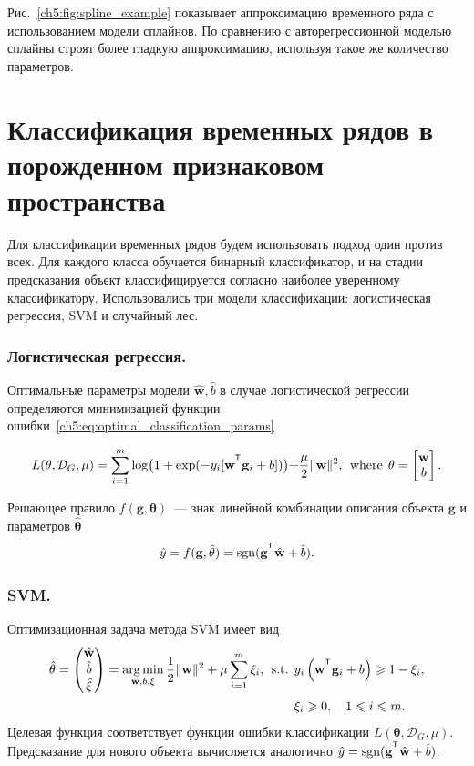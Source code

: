 Рис.~\ref{ch5:fig:spline_example} показывает аппроксимацию временного ряда с использованием модели сплайнов.
По сравнению с авторегрессионной моделью сплайны строят более гладкую аппроксимацию, используя такое же количество параметров.

\section{Классификация временных рядов в порожденном признаковом пространства}
Для классификации временных рядов будем использовать подход один против всех. 
Для каждого класса обучается бинарный классификатор, и на стадии предсказания объект классифицируется согласно наиболее уверенному классификатору.
Использовались три модели классификации: логистическая регрессия, SVM и случайный лес.

\subsubsection{Логистическая регрессия.}
Оптимальные параметры модели $\hat{\mathbf{w}}, \hat{b}$  в случае логистической регрессии определяются минимизацией функции ошибки~\eqref{ch5:eq:optimal_classification_params}

\begin{equation*}
L(\mathbf{\theta}, \mathcal{D}_G, \mu) = \sum_{i=1}^{m} \log\bigl(1 + \exp(-y_i [\mathbf{w}^{\T} \mathbf{g}_i + b])\bigl) + \frac{\mu}{2} \|\mathbf{w}\|^2, \:\:\mbox{where}\:\: \mathbf{\theta}  = \begin{bmatrix}
\mathbf{w} \\ b
\end{bmatrix}.
\end{equation*}

Решающее правило $f(\mathbf{g}, \mathbf{\theta})$~--- знак линейной комбинации описания объекта $\mathbf{g}$ и параметров $\hat{\mathbf{\theta}}$
\begin{equation*}
\hat{y} = f(\mathbf{g}, \hat{\mathbf{\theta}}) = \sgn(\mathbf{g}^{\T} \hat{\mathbf{w}} + \hat{b}).
\end{equation*}

\subsubsection{SVM.}
Оптимизационная задача метода SVM имеет вид
\begin{align*}
\hat{\mathbf{\theta}}  = \begin{pmatrix}
\hat{\mathbf{w}} \\ \hat{b} \\ \hat{\mathbf{\xi}}
\end{pmatrix}= \argmin_{\mathbf{w}, b, \mathbf{\xi}}  \frac{1}{2} \|\mathbf{w}\|^2 + \mu \sum_{i=1}^{m} \xi_i,\:\:
\mbox{s.t.} \:\: &y_i \left(\mathbf{w}^{\T} \mathbf{g}_i + b\right) \geq 1 - \xi_i,\\
&\xi_i \geq 0, \quad 1 \leq i \leq m.
\end{align*}
Целевая функция соответствует функции ошибки классификации $L(\mathbf{\theta}, \mathcal{D}_G, \mu)$.
Предсказание для нового объекта вычисляется аналогично $
\hat{y} = \sgn (\mathbf{g}^{\T} \hat{\mathbf{w}} + \hat{b})$.

